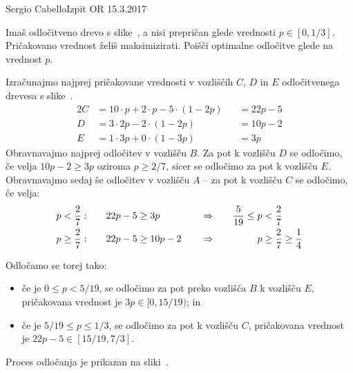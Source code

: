 \begin{naloga}{Sergio Cabello}{Izpit OR 15.3.2017}
\begin{vprasanje}
Imaš odločitveno drevo s slike~\fig,
a nisi prepričan glede vrednosti $p \in [0, 1/3]$.
Pričakovano vrednost želiš maksimizirati.
Poišči optimalne odločitve glede na vrednost $p$.

\begin{slika}
\pgfslika
{}
\end{slika}
\end{vprasanje}

\begin{odgovor}
Izračunajmo najprej pričakovane vrednosti v vozliščih $C$, $D$ in $E$
odločitvenega drevesa s slike~\fig.
\begin{alignat*}{2}
C &= 10 \cdot p + 2 \cdot p - 5 \cdot (1-2p) &&= 22p - 5 \\
D &= 3 \cdot 2p - 2 \cdot (1-2p) &&= 10p - 2 \\
E &= 1 \cdot 3p + 0 \cdot (1 - 3p) &&= 3p
\end{alignat*}
Obravnavajmo najprej odločitev v vozlišču $B$.
Za pot k vozlišču $D$ se odločimo,
če velja $10p - 2 \ge 3p$ oziroma $p \ge 2/7$,
sicer se odločimo za pot k vozlišču $E$.
Obravnavajmo sedaj še odločitev v vozlišču $A$
-- za pot k vozlišču $C$ se odločimo, če velja:
\begin{alignat*}{4}
p < {2 \over 7}: &\quad& 22p - 5 &\ge 3p
&\quad&\Rightarrow \quad & {5 \over 19} \le p &< {2 \over 7} \\
p \ge {2 \over 7}: &\quad& 22p - 5 &\ge 10p-2
&\quad&\Rightarrow \quad & p &\ge {2 \over 7} \ge {1 \over 4}
\end{alignat*}

\needspace{\baselineskip}
Odločamo se torej tako:
\begin{itemize}
\item če je $0 \le p < 5/19$,
se odločimo za pot preko vozlišča $B$ k vozlišču $E$,
pričakovana vrednost je $3p \in [0, 15/19)$; in
\item če je $5/19 \le p \le 1/3$,
se odločimo za pot k vozlišču $C$,
pričakovana vrednost je $22p-5 \in [15/19, 7/3]$.
\end{itemize}
Proces odločanja je prikazan na sliki~.

\begin{slika}
\end{slika}
\end{odgovor}
\end{naloga}
